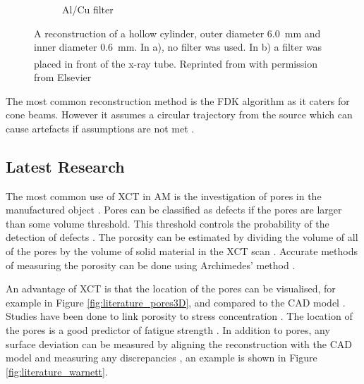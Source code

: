 \begin{figure}
\begin{subfigure}[b]{0.4\textwidth}
      \caption{Al/Cu filter}
    \end{subfigure}
  \caption{A reconstruction of a hollow cylinder, outer diameter \SI{6.0}{\milli\metre} and inner diameter \SI{0.6}{\milli\metre}. In a), no filter was used. In b) a filter was placed in front of the x-ray tube. Reprinted from \citep{kruth2011computed}\textsuperscript{\textcopyright} with permission from Elsevier}
  \label{fig:literature_hardening}
\end{figure}

The most common reconstruction method is the FDK \citep{feldkamp1984practical} algorithm as it caters for cone beams. However it assumes a circular trajectory from the source which can cause artefacts if assumptions are not met \citep{sun2016applications}.

\subsection{Latest Research}

The most common use of XCT in AM is the investigation of pores in the manufactured object \citep{thompson2016x}. Pores can be classified as defects if the pores are larger than some volume threshold. This threshold controls the probability of the detection of defects \citep{gandossi2010probability, amrhein2014characterization}. The porosity can be estimated by dividing the volume of all of the pores by the volume of solid material in the XCT scan \citep{taud2005porosity}. Accurate methods of measuring the porosity can be done using Archimedes' method \citep{spierings2011comparison}.

An advantage of XCT is that the location of the pores can be visualised, for example in Figure \ref{fig:literature_pores3D}, and compared to the CAD model \citep{lee2015compliance, villarraga2015assessing, kim2016inspection}. Studies have been done to link porosity to stress concentration \citep{leuders2015fatigue, siddique2015computed, carlton2016damage}. The location of the pores is a good predictor of fatigue strength \citep{leuders2015fatigue}. In addition to pores, any surface deviation can be measured by aligning the reconstruction with the CAD model and measuring any discrepancies \citep{lee2015compliance, villarraga2015assessing, kim2016inspection}, an example is shown in Figure \ref{fig:literature_warnett}.

